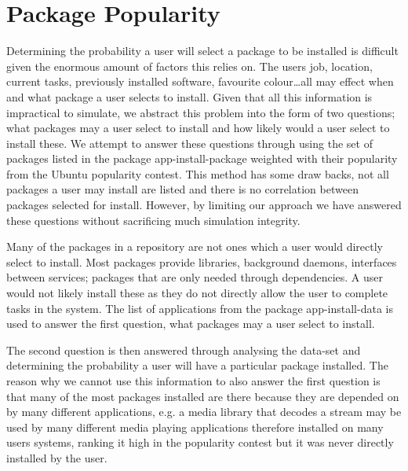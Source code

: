 \section{Package Popularity}
{}Determining the probability a user will select a package to be installed is difficult given the enormous amount of factors this relies on.
{}The users job, location, current tasks, previously installed software, favourite colour\ldots all may effect when and what package a user selects to install.
{}Given that all this information is impractical to simulate, we abstract this problem into the form of two questions;
{}what packages may a user select to install and how likely would a user select to install these.
{}We attempt to answer these questions through using the set of packages listed in the package app-install-package
{}weighted with their popularity from the Ubuntu popularity contest.
{}This method has some draw backs, not all packages a user may install are listed and there is no correlation between packages selected for install.
{}However, by limiting our approach we have answered these questions without sacrificing much simulation integrity.

Many of the packages in a repository are not ones which a user would directly select to install.
Most packages provide libraries, background daemons, interfaces between services; packages that are only needed through dependencies.
A user would not likely install these as they do not directly allow the user to complete tasks in the system.
The list of applications from the package app-install-data is used to answer the first question, what packages may a user select to install.

The second question is then answered through analysing the data-set and determining the probability a user will have a particular package installed.
The reason why we cannot use this information to also answer the first question is that many of the most packages installed are there because they are depended on by many different applications,
e.g. a media library that decodes a stream may be used by many different media playing applications therefore installed on many users systems, 
ranking it high in the popularity contest but it was never directly installed by the user.



